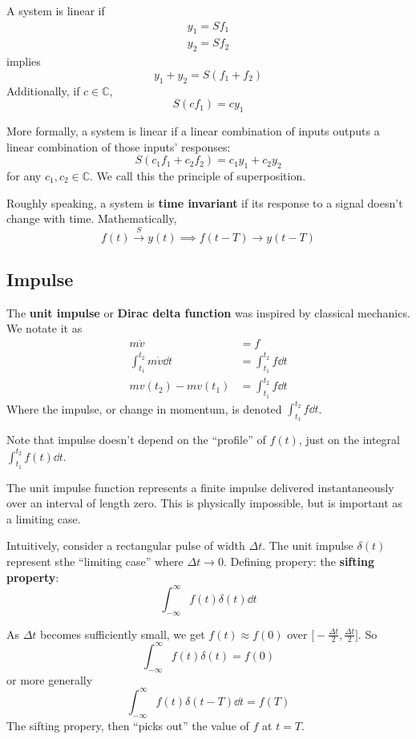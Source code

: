 \documentclass[12pt]{article}
\begin{document}
A system is linear if
\begin{align*}
y_1 = Sf_1 \\
y_2 = Sf_2
\end{align*}
implies \[ y_1 + y_2 = S(f_1 + f_2) \] Additionally, if $c \in \mathbb{C}$, \[ S(cf_1) = cy_1 \]

More formally, a system is linear if a linear combination of inputs outputs a linear combination of those inputs' responses: \[ S(c_1f_1 + c_2f_2) = c_1y_1 + c_2y_2 \] for any $c_1, c_2 \in \mathbb{C}$. We call this the principle of superposition.

Roughly speaking, a system is {\bf time invariant} if its response to a signal doesn't change with time. Mathematically, \[ f(t) \xrightarrow{S} y(t) \implies f(t-T) \rightarrow y(t-T) \]

\subsection{Impulse}
The {\bf unit impulse} or {\bf Dirac delta function} was inspired by classical mechanics. We notate it as
\begin{align*}
m\dot v &= f \\
\int_{t_1}^{t_2} m\dot v \dd t &= \int_{t_1}^{t_2} f \dd t \\
mv(t_2) - mv(t_1) &= \int_{t_1}^{t_2} f \dd t
\end{align*}
Where the impulse, or change in momentum, is denoted $\displaystyle\int_{t_1}^{t_2} f \dd t$.

Note that impulse doesn't depend on the ``profile'' of $f(t)$, just on the integral $\displaystyle\int_{t_1}^{t_2} f(t)\dd t$.

The unit impulse function represents a finite impulse delivered instantaneously over an interval of length zero. This is physically impossible, but is important as a limiting case.

Intuitively, consider a rectangular pulse of width $\Delta t$. The unit impulse $\delta(t)$ represent sthe ``limiting case'' where $\Delta t \to 0$. Defining propery: the {\bf sifting property}: \[ \int_{-\infty}^\infty f(t) \delta(t) \dd t \]

As $\Delta t$ becomes sufficiently small, we get $f(t) \approx f(0)$ over $\bigl[-\frac{\Delta t}{2}, \frac{\Delta t}{2}\bigl]$. So \[ \int_{-\infty}^\infty f(t) \delta(t) = f(0) \] or more generally \[ \int_{-\infty}^\infty f(t) \delta(t-T) \dd t = f(T) \] The sifting propery, then ``picks out'' the value of $f$ at $t=T$.
\end{document}
